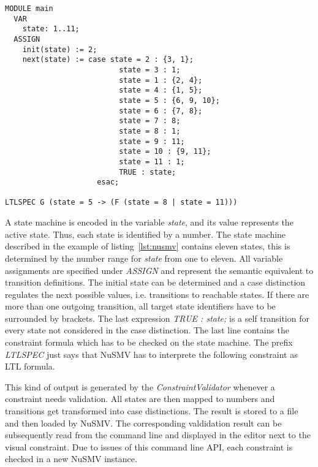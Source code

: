 \begin{lstlisting}[float = htbp, captionpos=b, breaklines=true, showspaces=false, showtabs=false, tabsize=2, caption=Example of a NuSMV diagram file., label=lst:nusmv]
MODULE main
  VAR
    state: 1..11;
  ASSIGN
    init(state) := 2;
    next(state) := case state = 2 : {3, 1};
                          state = 3 : 1;
                          state = 1 : {2, 4};
                          state = 4 : {1, 5};
                          state = 5 : {6, 9, 10};
                          state = 6 : {7, 8};
                          state = 7 : 8;
                          state = 8 : 1;
                          state = 9 : 11;
                          state = 10 : {9, 11};
                          state = 11 : 1;
                          TRUE : state;
                     esac;

LTLSPEC G (state = 5 -> (F (state = 8 | state = 11)))
\end{lstlisting}
A state machine is encoded in the variable \emph{state}, and its value represents the active state. Thus, each state is identified by a number. The state machine described in the example of listing~\ref{lst:nusmv} contains eleven states, this is determined by the number range for \emph{state} from one to eleven. All variable assignments are specified under \emph{ASSIGN} and represent the semantic equivalent to transition definitions. The initial state can be determined and a case distinction regulates the next possible values, i.e. transitions to reachable states. If there are more than one outgoing transition, all target state identifiers have to be surrounded by brackets. The last expression \emph{TRUE : state;} is a self transition for every state not considered in the case distinction.
The last line contains the constraint formula which has to be checked on the state machine. The prefix \emph{LTLSPEC} just says that NuSMV has to interprete the following constraint as LTL formula.

This kind of output is generated by the \emph{ConstraintValidator} whenever a constraint needs validation. All states are then mapped to numbers and transitions get transformed into case distinctions. The result is stored to a file and then loaded by NuSMV. The corresponding valdidation result can be subsequently read from the command line and displayed in the editor next to the visual constraint. Due to issues of this command line API, each constraint is checked in a new NuSMV instance.

